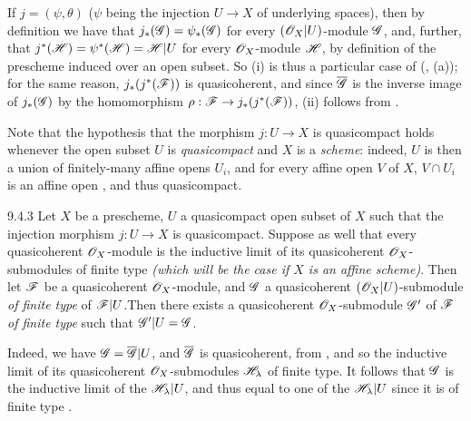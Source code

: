 \documentclass[10pt,oneside]{book}
\begin{document}
If $j=(\psi,\theta)$ ($\psi$ being the injection $U\to X$ of underlying spaces), then by
definition we have that $j_*(\mathscr{G})=\psi_*(\mathscr{G})$ for every $(\mathscr{O}_X|U)$-module $\mathscr{G}$,
and, further, that $j^*(\mathscr{H})=\psi^*(\mathscr{H})=\mathscr{H}|U$ for every $\mathscr{O}_X$-module $\mathscr{H}$,
by definition of the prescheme induced over an open subset. So (i) is thus a particular case
of (, (a)); for the same reason, $j_*(j^*(\mathscr{F}))$ is quasicoherent, and
since $\overline{\mathscr{G}}$ is the inverse image of $j_*(\mathscr{G})$ by the homomorphism
$\rho:\mathscr{F}\to j_*(j^*(\mathscr{F}))$, (ii) follows from .
 
Note that the hypothesis that the morphism $j:U\to X$ is quasicompact
holds whenever the open subset $U$ is \emph{quasicompact} and $X$ is a
\emph{scheme}: indeed, $U$ is then a union of finitely-many affine opens $U_i$,
and for every affine open $V$ of $X$, $V\cap U_i$ is an affine open , and
thus quasicompact.
 
\begin{envs}[Corollary]{9.4.3}
\label{cor-1.9.4.3}
Let $X$ be a prescheme, $U$ a quasicompact open subset of $X$ such that the injection
morphism $j:U\to X$ is quasicompact. Suppose as well that every quasicoherent $\mathscr{O}_X$-module
is the inductive limit of its quasicoherent $\mathscr{O}_X$-submodules of finite type \emph{(which
will be the case if $X$ is an \emph{affine scheme})}. Then let $\mathscr{F}$ be a quasicoherent
$\mathscr{O}_X$-module, and $\mathscr{G}$ a quasicoherent $(\mathscr{O}_X|U)$-submodule \emph{of finite type} of
$\mathscr{F}|U$.Then there exists a quasicoherent $\mathscr{O}_X$-submodule $\mathscr{G}'$ of $\mathscr{F}$ \emph{of
finite type} such that $\mathscr{G}'|U=\mathscr{G}$.
\end{envs}
 
Indeed, we have $\mathscr{G}=\overline{\mathscr{G}}|U$, and $\overline{\mathscr{G}}$ is quasicoherent, from
, and so the inductive limit of its quasicoherent $\mathscr{O}_X$-submodules
$\mathscr{H}_\lambda$ of finite type. It follows that $\mathscr{G}$ is the inductive limit of the
$\mathscr{H}_\lambda|U$, and thus equal to one of the $\mathscr{H}_\lambda|U$ since it is of finite
type .
 
\end{document}
